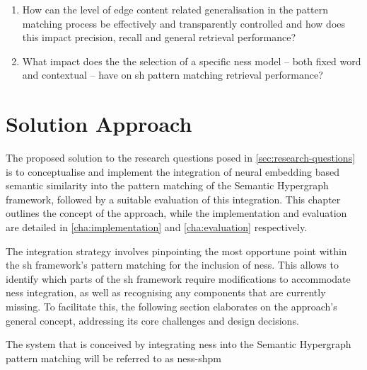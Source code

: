 \documentclass[11pt, numbers=noenddot]{scrreprt}
\begin{document}
\begin{enumerate}[label=\textbf{R.\arabic*}, leftmargin=0pt, labelwidth=*, align=left, labelsep=0.5em, itemindent=0pt, listparindent=\parindent]
    \item How can the level of edge content related generalisation in the pattern matching process be effectively and transparently controlled and how does this impact precision, recall and general retrieval performance?

    \item What impact does the the selection of a specific \gls{ness} model -- both fixed word and contextual -- have on \gls{sh} pattern matching retrieval performance?
\end{enumerate}


\chapter{Solution Approach}
\label{cha:solution-approach}

The proposed solution to the research questions posed in \cref{sec:research-questions} is to conceptualise and implement the integration of neural embedding based semantic similarity into the pattern matching of the Semantic Hypergraph framework, followed by a suitable evaluation of this integration. This chapter outlines the concept of the approach, while the implementation and evaluation are detailed in \cref{cha:implementation} and \cref{cha:evaluation} respectively.

The integration strategy involves pinpointing the most opportune point within the \gls{sh} framework's pattern matching for the inclusion of \gls{ness}. This  allows to identify which parts of the \gls{sh} framework require modifications to accommodate \gls{ness} integration, as well as recognising any components that are currently missing. To facilitate this, the following section elaborates on the approach's general concept, addressing its core challenges and design decisions. 

The system that is conceived by integrating \gls{ness} into the Semantic Hypergraph pattern matching will be  referred to as \gls{ness-shpm}
\end{document}
